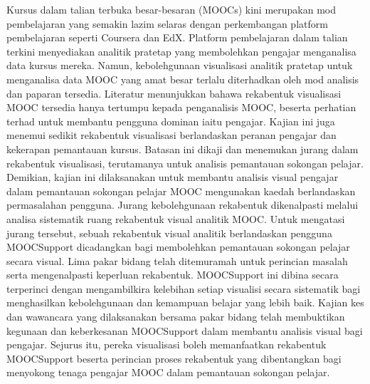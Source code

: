 
\noindent
Kursus dalam talian terbuka besar-besaran (MOOCs) kini merupakan mod pembelajaran yang semakin lazim selaras dengan perkembangan platform pembelajaran seperti Coursera dan EdX. Platform pembelajaran dalam talian terkini menyediakan analitik pratetap yang membolehkan pengajar menganalisa data kursus mereka. Namun, kebolehgunaan visualisasi analitik pratetap untuk menganalisa data MOOC yang amat besar terlalu diterhadkan oleh mod analisis dan paparan tersedia. Literatur menunjukkan bahawa rekabentuk visualisasi MOOC tersedia hanya tertumpu kepada penganalisis MOOC, beserta perhatian terhad untuk membantu pengguna dominan iaitu pengajar. Kajian ini juga menemui sedikit rekabentuk visualisasi berlandaskan peranan pengajar dan kekerapan pemantauan kursus. Batasan ini dikaji dan menemukan jurang dalam rekabentuk visualisasi, terutamanya untuk analisis pemantauan sokongan pelajar. Demikian, kajian ini dilaksanakan untuk membantu analisis visual pengajar dalam pemantauan sokongan pelajar MOOC mengunakan kaedah berlandaskan permasalahan pengguna. Jurang kebolehgunaan rekabentuk dikenalpasti melalui analisa sistematik ruang rekabentuk visual analitik MOOC. Untuk mengatasi jurang tersebut, sebuah rekabentuk visual analitik berlandaskan pengguna MOOCSupport dicadangkan bagi membolehkan pemantauan sokongan pelajar secara visual. Lima pakar bidang telah ditemuramah untuk perincian masalah serta mengenalpasti keperluan rekabentuk. MOOCSupport ini dibina secara terperinci dengan mengambilkira kelebihan setiap visualisi secara sistematik bagi menghasilkan kebolehgunaan dan kemampuan belajar yang lebih baik. Kajian kes dan wawancara yang dilaksanakan bersama pakar bidang telah membuktikan kegunaan dan keberkesanan MOOCSupport dalam membantu analisis visual bagi pengajar. Sejurus itu, pereka visualisasi boleh memanfaatkan rekabentuk MOOCSupport beserta perincian proses rekabentuk yang dibentangkan bagi menyokong tenaga pengajar MOOC dalam pemantauan sokongan pelajar.
 
